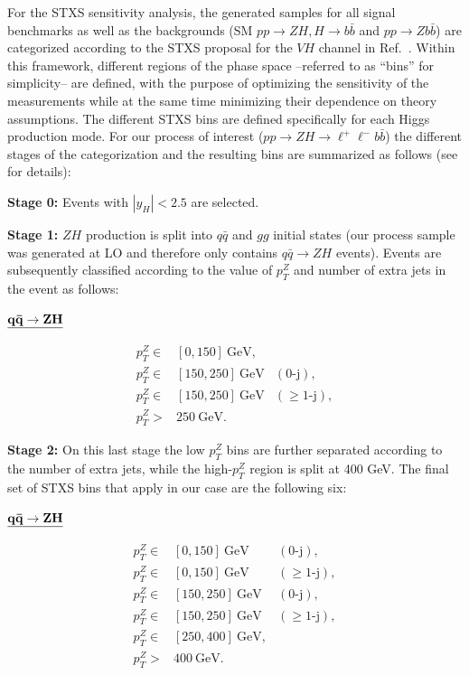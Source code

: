 For the STXS sensitivity analysis, the generated samples for all signal benchmarks as well as the backgrounds (SM $pp \to ZH, H\to b\bar{b}$ and $pp\to Zb\bar{b}$) are categorized according to the STXS proposal for the $VH$ channel in Ref.~\cite{deFlorian:2016spz}. Within this framework, different regions of the phase space --referred to as ``bins'' for simplicity-- are defined, with the purpose of optimizing the sensitivity of the measurements while at the same time minimizing their dependence on theory assumptions. The different STXS bins are defined specifically for each Higgs production mode. For our process of interest ($pp \to ZH \to \ell^+ \ell^- b\bar{b}$) the different stages of the categorization and the resulting bins are summarized as follows (see \cite{deFlorian:2016spz} for details):
\vspace{0.5cm}
%
\begin{itemize}
{\item  {\bf Stage 0:} Events with $\left|y_H\right| <2.5$ are selected.}
%
{\item {\bf Stage 1:} $ZH$ production is split into $q\bar{q}$ and $gg$ initial states (our process sample was generated at LO and therefore only contains $q\bar{q}\to ZH$ events). Events are subsequently classified according to the value of $p_T^Z$ and number of extra jets in the event as follows:
%
\vspace{0.25cm}
%
\begin{center}
${\bf \underline{q\bar{q}\to ZH}}$
\end{center}
\begin{eqnarray}
p_T^Z \in& [0,150]~\mathrm{GeV},& \nonumber\\
%
p_T^Z \in& [150,250]~\mathrm{GeV}&(0\mbox{-}\mathrm{j}),\\
%
p_T^Z \in& [150,250]~\mathrm{GeV}&(\geq 1\mbox{-}\mathrm{j}),\nonumber\\
%
p_T^Z >&250~\mathrm{GeV}.\nonumber&
\end{eqnarray}
}
%
%
{\item {\bf Stage 2:} On this last stage the low $p_T^Z$ bins are further separated according to the number of extra jets, while the high-$p_T^Z$ region is split at 400 GeV. The final set of STXS bins that apply in our case are the following six:
%
\vspace{0.25cm}
%
\begin{center}
${\bf \underline{q\bar{q}\to ZH}}$
\end{center}
\begin{eqnarray}
p_T^Z \in& [0,150]~\mathrm{GeV}&(0\mbox{-}\mathrm{j}),\nonumber\\
%
p_T^Z \in& [0,150]~\mathrm{GeV}&(\geq 1\mbox{-}\mathrm{j}),\nonumber\nonumber\\
%
p_T^Z \in& [150,250]~\mathrm{GeV}&(0\mbox{-}\mathrm{j}),\\
%
p_T^Z \in& [150,250]~\mathrm{GeV}&(\geq 1\mbox{-}\mathrm{j}),\nonumber\\
%
p_T^Z \in& [250,400]~\mathrm{GeV},&\nonumber\\
%
p_T^Z >&400~\mathrm{GeV}.\nonumber&
\end{eqnarray}
}
\end{itemize}
